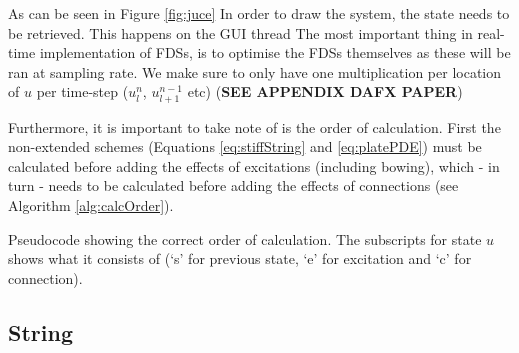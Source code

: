 \documentclass{article}
\begin{document}
% 
As can be seen in Figure \ref{fig:juce}
In order to draw the system, the state needs to be retrieved. This happens on the GUI thread
The most important thing in real-time implementation of FDSs, is to optimise the FDSs themselves as these will be ran at sampling rate. We make sure to only have one multiplication per location of $u$ per time-step ($u_l^n$, $u_{l+1}^{n-1}$ etc) (\textbf{SEE APPENDIX DAFX PAPER}) %

Furthermore, it is important to take note of is the order of calculation. First the non-extended schemes (Equations \eqref{eq:stiffString} and \eqref{eq:platePDE}) must be calculated before adding the effects of excitations (including bowing), which - in turn - needs to be calculated before adding the effects of connections (see Algorithm \ref{alg:calcOrder}).

\begin{algorithm}[h]\label{alg:calcOrder}
 \caption{Pseudocode showing the correct order of calculation. The subscripts for state $u$ shows what it consists of (`s' for previous state, `e' for excitation and `c' for connection).}
\end{algorithm}



\subsection{String}
\end{document}
